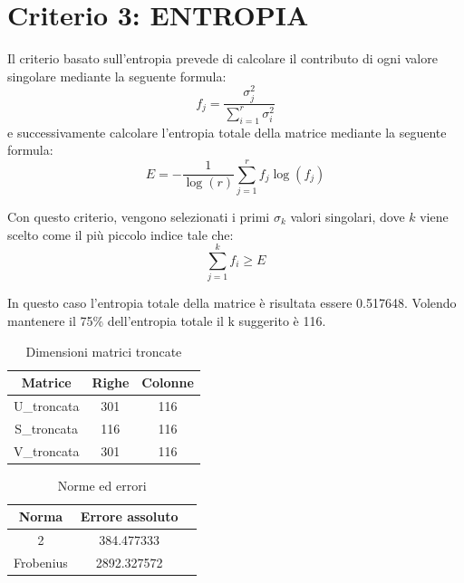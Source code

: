 \section{Criterio 3: ENTROPIA}

Il criterio basato sull'entropia prevede di calcolare il contributo di ogni valore singolare mediante la seguente formula:
\begin{equation}
    f_j=\frac{\sigma_j^2}{\sum_{i=1}^{r}\sigma_i^2}
    \label{fj:contributi}
\end{equation}
e successivamente calcolare l'entropia totale della matrice mediante la seguente formula:
\begin{equation}
    E = -\frac{1}{\log(r)}\sum_{j=1}^r f_j \log(f_j)
\end{equation}

\noindent Con questo criterio, vengono selezionati i primi $\sigma_k$ valori singolari, dove $k$ viene scelto come il più piccolo indice tale che:
\begin{equation}
\sum_{j=1}^k f_i \geq E
\end{equation}

In questo caso l'entropia totale della matrice è risultata essere 0.517648. Volendo mantenere il 75\% dell'entropia totale il k suggerito è 116.
\begin{table}[H]
    \centering
    \begin{tabular}{|c|c|c|}
        \hline
        \textbf{Matrice} & \textbf{Righe} & \textbf{Colonne} \\
        \hline
        U\_troncata & 301 & 116 \\
        \hline
        S\_troncata & 116 & 116 \\
        \hline
        V\_troncata & 301 & 116 \\
        \hline
    \end{tabular}
    \caption{Dimensioni matrici troncate}
\end{table}

\begin{table}[H]
    \centering
    \begin{tabular}{|c|c|c|}
        \hline
        \textbf{Norma} &\textbf{Errore assoluto} \\
        \hline
        2 &  384.477333 \\
        \hline
        Frobenius & 2892.327572 \\
        \hline
    \end{tabular}
    \caption{Norme ed errori}
\end{table}

